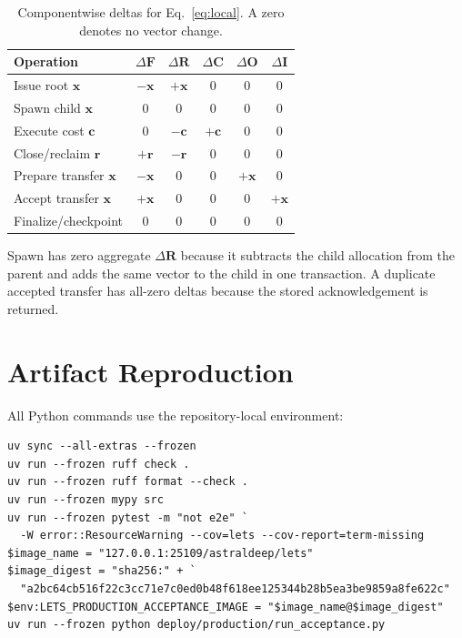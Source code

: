\documentclass[10pt]{article}
\newcommand{\vect}[1]{\boldsymbol{#1}}
\begin{document}
\begin{table}[ht]
\centering
\caption{Componentwise deltas for Eq.~\ref{eq:local}. A zero denotes no vector change.}
\small
\begin{tabular}{@{}lccccc@{}}
\toprule
Operation & $\Delta\vect{F}$ & $\Delta\vect{R}$ & $\Delta\vect{C}$ & $\Delta\vect{O}$ & $\Delta\vect{I}$ \\
\midrule
Issue root $\vect{x}$ & $-\vect{x}$ & $+\vect{x}$ & 0 & 0 & 0 \\
Spawn child $\vect{x}$ & 0 & 0 & 0 & 0 & 0 \\
Execute cost $\vect{c}$ & 0 & $-\vect{c}$ & $+\vect{c}$ & 0 & 0 \\
Close/reclaim $\vect{r}$ & $+\vect{r}$ & $-\vect{r}$ & 0 & 0 & 0 \\
Prepare transfer $\vect{x}$ & $-\vect{x}$ & 0 & 0 & $+\vect{x}$ & 0 \\
Accept transfer $\vect{x}$ & $+\vect{x}$ & 0 & 0 & 0 & $+\vect{x}$ \\
Finalize/checkpoint & 0 & 0 & 0 & 0 & 0 \\
\bottomrule
\end{tabular}
\end{table}

Spawn has zero aggregate $\Delta\vect{R}$ because it subtracts the child allocation from the
parent and adds the same vector to the child in one transaction. A duplicate accepted transfer has
all-zero deltas because the stored acknowledgement is returned.

\section{Artifact Reproduction}

All Python commands use the repository-local environment:
\begin{verbatim}
uv sync --all-extras --frozen
uv run --frozen ruff check .
uv run --frozen ruff format --check .
uv run --frozen mypy src
uv run --frozen pytest -m "not e2e" `
  -W error::ResourceWarning --cov=lets --cov-report=term-missing
$image_name = "127.0.0.1:25109/astraldeep/lets"
$image_digest = "sha256:" + `
  "a2bc64cb516f22c3cc71e7c0ed0b48f618ee125344b28b5ea3be9859a8fe622c"
$env:LETS_PRODUCTION_ACCEPTANCE_IMAGE = "$image_name@$image_digest"
uv run --frozen python deploy/production/run_acceptance.py
\end{verbatim}
\end{document}
